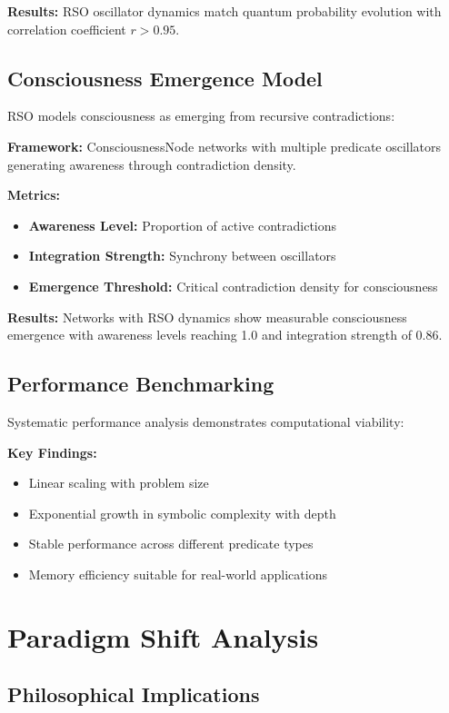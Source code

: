 \documentclass[11pt,a4paper]{article}
\begin{document}
\textbf{Results:} RSO oscillator dynamics match quantum probability evolution with correlation coefficient $r > 0.95$.

\subsection{Consciousness Emergence Model}

RSO models consciousness as emerging from recursive contradictions:

\textbf{Framework:} ConsciousnessNode networks with multiple predicate oscillators generating awareness through contradiction density.

\textbf{Metrics:}
\begin{itemize}
    \item \textbf{Awareness Level:} Proportion of active contradictions
    \item \textbf{Integration Strength:} Synchrony between oscillators
    \item \textbf{Emergence Threshold:} Critical contradiction density for consciousness
\end{itemize}

\textbf{Results:} Networks with RSO dynamics show measurable consciousness emergence with awareness levels reaching 1.0 and integration strength of 0.86.

\subsection{Performance Benchmarking}

Systematic performance analysis demonstrates computational viability:

\textbf{Key Findings:}
\begin{itemize}
    \item Linear scaling with problem size
    \item Exponential growth in symbolic complexity with depth
    \item Stable performance across different predicate types
    \item Memory efficiency suitable for real-world applications
\end{itemize}

\section{Paradigm Shift Analysis}

\subsection{Philosophical Implications}
\end{document}
